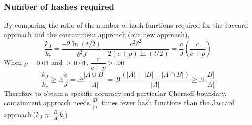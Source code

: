 \documentclass[11pt]{amsart}
\theoremstyle{remark}
\numberwithin{equation}{section}
\begin{document}
\subsubsection{Number of hashes required}
By comparing the ratio of the number of hash functions required for the Jaccard approach and the containment approach (our new approach), 
$$\dfrac{k_J}{k_c}=\dfrac{-2\ln(t/2)}{\delta^2 J} \dfrac{c^2\delta^2}{-2(c+p)\ln(t/2)}=\dfrac{c}{J}\left(\dfrac{c}{c+p}\right)$$
When $p=0.01$ and $\geq0.01$, $ \dfrac{c}{c+p}\geq.90$
$$\dfrac{k_J}{k_c}\geq .9\frac{c}{J}=.9 \dfrac{|A\cup B|}{|A|}=.9 \dfrac{(|A|+|B|-|A\cap B|)}{|A|}\geq .9 \dfrac{|B|}{|A|}$$
Therefore to obtain a specific accuracy and particular Chernoff boundary, containment approach needs $\frac{|B|}{|A|}$ times fewer hash functions than the Jaccard approach.($k_J \approx\frac{|B|}{|A|}k_c$)\\
\end{document}
